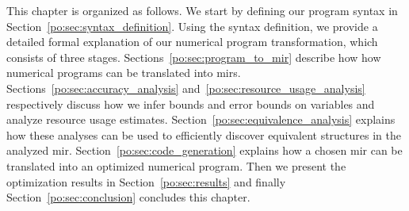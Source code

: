 This chapter is organized as follows.  We start by defining our
program syntax in Section~\ref{po:sec:syntax_definition}.  Using the
syntax definition, we provide a detailed formal explanation of our
numerical program transformation, which consists of three stages.
Sections~\ref{po:sec:program_to_mir} describe how how numerical programs can
be translated into \glspl{mir}.  Sections~\ref{po:sec:accuracy_analysis}
and~\ref{po:sec:resource_usage_analysis} respectively discuss how we infer
bounds and error bounds on variables and analyze resource usage estimates.
Section~\ref{po:sec:equivalence_analysis} explains how these analyses can
be used to efficiently discover equivalent structures in the analyzed
\gls{mir}\@.  Section~\ref{po:sec:code_generation} explains how a chosen
\gls{mir} can be translated into an optimized numerical program.  Then we
present the optimization results in Section~\ref{po:sec:results} and finally
Section~\ref{po:sec:conclusion} concludes this chapter.
